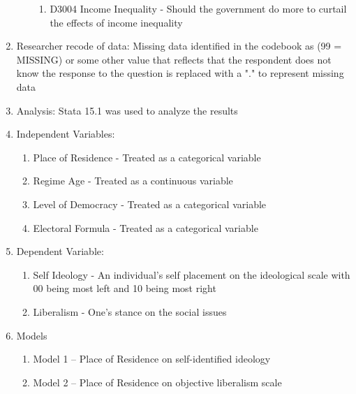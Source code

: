 \documentclass[12pt]{article}
\begin{document}
\begin{enumerate}
\begin{enumerate}
\begin{enumerate}
		\item D3004 Income Inequality - Should the government do more to curtail the effects of income inequality
	\end{enumerate}
\end{enumerate}
\item Researcher recode of data: Missing data identified in the codebook as (99 = MISSING) or some other value that reflects that the respondent does not know the response to the question is replaced with a "." to represent missing data
\item Analysis: Stata 15.1 was used to analyze the results
\item Independent Variables:
\begin{enumerate}
	\item Place of Residence - Treated as a categorical variable
	\item Regime Age - Treated as a continuous variable
	\item Level of Democracy - Treated as a categorical variable
	\item Electoral Formula - Treated as a categorical variable
\end{enumerate}
\item Dependent Variable:
\begin{enumerate}
	\item Self Ideology - An individual's self placement on the ideological scale with 00 being most left and 10 being most right
	\item Liberalism - One's stance on the social issues
\end{enumerate}
\item Models 
\begin{enumerate}
	\item Model 1 -- Place of Residence on self-identified ideology
	\item Model 2 -- Place of Residence on objective liberalism scale
\end{enumerate}
\end{enumerate}
\end{document}
